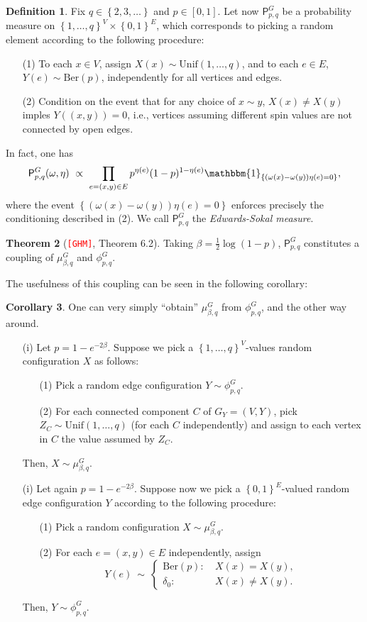 \documentclass[12pt]{article}
\newcommand{\PP}{\mathsf{P}}
\newcommand{\set}[1]{\left\{#1\right\}}
\newcommand{\1}{\mathbbm{1}}
\newcommand{\5}{\vspace{0.5cm}}
\theoremstyle{definition}
\newtheorem{thm}{Theorem}[section]
\newtheorem{df}[thm]{Definition}
\newtheorem{cor}[thm]{Corollary}
\begin{document}
\begin{df}
Fix $q\in\set{2,3,\ldots}$ and $p\in[0,1]$. Let now $\PP_{p,q}^G$ be a probability measure on $\set{1,\ldots,q}^V\times\set{0,1}^E$, which corresponds to picking a random element according to the following procedure:
\begin{itemize}
	\item[(1)] To each $x\in V$, assign $X(x)\sim\mathrm{Unif}(1,\ldots,q)$, and to each $e\in E$, $Y(e)\sim\mathrm{Ber}(p)$, independently for all vertices and edges.
	\item[(2)] Condition on the event that for any choice of $x\sim y$, $X(x)\neq X(y)$ imples $Y((x,y))=0$, i.e., vertices assuming different spin values are not connected by open edges.
\end{itemize}
In fact, one has
$$\PP_{p,q}^G(\omega,\eta) ~\propto~ \prod_{e=(x,y)\in E}p^{\eta(e)}(1-p)^{1-\eta(e)}\1_{\set{(\omega(x)-\omega(y))\eta(e)=0}},$$
where the event $\set{(\omega(x)-\omega(y))\eta(e)=0}$ enforces precisely the conditioning described in (2). We call $\PP_{p,q}^G$ the \textit{Edwards-Sokal measure}.
\end{df}

\begin{thm}[\textcolor{red}{\texttt{[GHM]}}, Theorem 6.2]
Taking $\beta=\frac{1}{2}\log(1-p)$, $\PP_{p,q}^G$ constitutes a coupling of $\mu_{\beta,q}^G$ and $\phi_{p,q}^G$.	
\end{thm}

The usefulness of this coupling can be seen in the following corollary:

\begin{cor}
One can very simply ``obtain'' $\mu_{\beta,q}^G$ from $\phi_{p,q}^G$, and the other way around.
\begin{itemize}
	\item[(i)] Let $p=1-e^{-2\beta}$. Suppose we pick a $\set{1,\ldots,q}^V$-values random configuration $X$ as follows:
	\begin{itemize}
		\item[(1)] Pick a random edge configuration $Y\sim\phi_{p,q}^G$.
		\item[(2)]  For each connected component $C$ of $G_Y=(V,Y)$, pick $Z_C\sim\mathrm{Unif}(1,\ldots,q)$ (for each $C$ independently) and assign to each vertex in $C$ the value assumed by $Z_C$.
	\end{itemize}
	Then, $X\sim\mu_{\beta,q}^G$.
	\item[(i)] Let again $p=1-e^{-2\beta}$. Suppose now we pick a $\set{0,1}^E$-valued random edge configuration $Y$ according to the following procedure:
	\begin{itemize}
		\item[(1)] Pick a random configuration $X\sim\mu_{\beta,q}^G$.
		\item[(2)] For each $e=(x,y)\in E$ independently, assign
		$$Y(e) ~\sim~ \begin{cases}
		\mathrm{Ber}(p): ~&X(x)=X(y),\\
		\delta_0: ~&X(x)\neq X(y).
		\end{cases}$$
	\end{itemize}
	Then, $Y\sim\phi_{p,q}^G$.
\end{itemize}
\end{cor}
\end{document}
